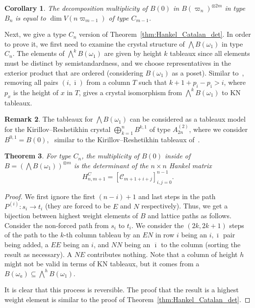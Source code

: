 \documentclass[11pt, leqno]{amsart}
\theoremstyle{plain}
\newtheorem{theorem}{Theorem}[section]
\newtheorem{corollary}[theorem]{Corollary}
\theoremstyle{definition}
\newtheorem{remark}[theorem]{Remark}
\numberwithin{equation}{section}
\newcommand{\fw}{\varpi} %
\newcommand{\Cat}{\mathcal{C}} %
\begin{document}
\begin{corollary}
The decomposition multiplicity of $B(0)$ in $B(\fw_n)^{\otimes 2m}$ in type $B_n$ is equal to $\dim V(n \fw_{m-1})$ of type $C_{m-1}$.
\end{corollary}

Next, we give a type $C_n$ version of Theorem~\ref{thm:Hankel_Catalan_det}. In order to prove it, we first need to examine the crystal structure of $\bigwedge B(\omega_1)$ in type $C_n$. The elements of $\bigwedge^k B(\omega_1)$ are given by height $k$ tableaux since all elements must be distinct by semistandardness, and we choose representatives in the exterior product that are ordered (considering $B(\omega_1)$ as a poset). Similar to~\cite{S05}, removing all pairs $(i, \overline{\imath})$ from a column $T$ such that $k + 1 + p_i - p_{\overline{\imath}} > i$, where $p_x$ is the height of $x$ in $T$, gives a crystal isomorphism from $\bigwedge^k B(\omega_1)$ to KN tableaux.

\begin{remark}
\label{remark:KR_tableaux}
The tableaux for $\bigwedge B(\omega_1)$ can be considered as a tableaux model for the Kirillov--Reshetikhin crystal $\bigoplus_{k=1}^n B^{k,1}$ of type $A_{2n}^{(2)}$, where we consider $B^{0,1} = B(0)$,~\cite{OS08,FOS09} similar to the Kirillov--Reshetikhin tableaux  of~\cite{SchillingS15}.
\end{remark}

\begin{theorem}
\label{thm:Hankel_Catalan_type_C}
For type $C_n$, the multiplicity of $B(0)$ inside of $B = \left( \bigwedge B(\omega_1) \right)^{\otimes m}$ is the determinant of the $n \times n$ Hankel matrix
\[
H^C_{n,m+1} = \left[ \Cat_{m+1+i+j} \right]_{i,j=0}^{n-1}.
\]
\end{theorem}

\begin{proof}
We first ignore the first $(n-i) + 1$ and last steps in the path $P^{(i)} \colon s_i \to t_i$ (they are forced to be $E$ and $N$ respectively).
Thus, we get a bijection between highest weight elements of $B$ and lattice paths as follows. Consider the non-forced path from $s_i$ to $t_i$. We consider the $(2k, 2k+1)$ steps of the path to the $k$-th column tableau by an $E N$ in row $i$ being an $i, \overline{\imath}$ pair being added, a $E E$ being an $i$, and $N N$ being an $\overline{\imath}$ to the column (sorting the result as necessary). A $N E$ contributes nothing. Note that a column of height $h$ might not be valid in terms of KN tableaux, but it comes from a $B(\omega_a) \subseteq \bigwedge^h B(\omega_1)$.

It is clear that this process is reversible. The proof that the result is a highest weight element is similar to the proof of Theorem~\ref{thm:Hankel_Catalan_det}.
\end{proof}
\end{document}
